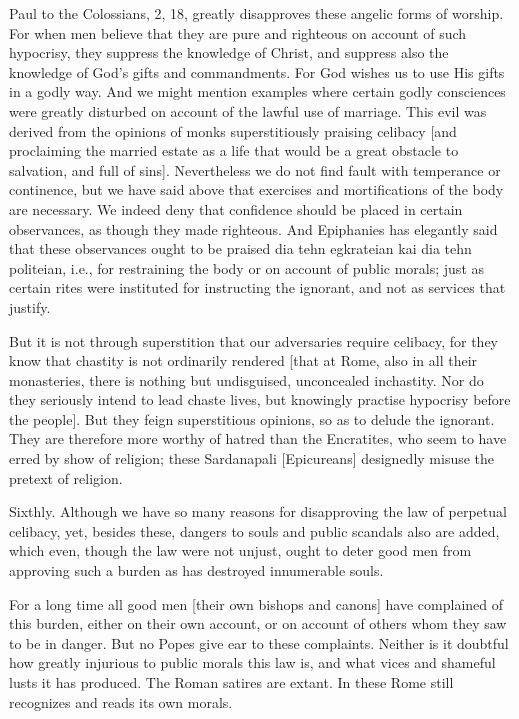 Paul to the Colossians, 2, 18, greatly disapproves these angelic
forms of worship.  For when men believe that they are pure and
righteous on account of such hypocrisy, they suppress the knowledge
of Christ, and suppress also the knowledge of God's gifts and
commandments.  For God wishes us to use His gifts in a godly way.
And we might mention examples where certain godly consciences were
greatly disturbed on account of the lawful use of marriage.  This
evil was derived from the opinions of monks superstitiously praising
celibacy [and proclaiming the married estate as a life that would be
a great obstacle to salvation, and full of sins].  Nevertheless we do
not find fault with temperance or continence, but we have said above
that exercises and mortifications of the body are necessary.  We
indeed deny that confidence should be placed in certain observances,
as though they made righteous.  And Epiphanies has elegantly said
that these observances ought to be praised dia tehn egkrateian kai
dia tehn politeian, i.e., for restraining the body or on account of
public morals; just as certain rites were instituted for instructing
the ignorant, and not as services that justify.

But it is not through superstition that our adversaries require
celibacy, for they know that chastity is not ordinarily rendered
[that at Rome, also in all their monasteries, there is nothing but
undisguised, unconcealed inchastity.  Nor do they seriously intend to
lead chaste lives, but knowingly practise hypocrisy before the
people].  But they feign superstitious opinions, so as to delude the
ignorant.  They are therefore more worthy of hatred than the
Encratites, who seem to have erred by show of religion; these
Sardanapali [Epicureans] designedly misuse the pretext of religion.

Sixthly.  Although we have so many reasons for disapproving the law
of perpetual celibacy, yet, besides these, dangers to souls and
public scandals also are added, which even, though the law were not
unjust, ought to deter good men from approving such a burden as has
destroyed innumerable souls.

For a long time all good men [their own bishops and canons] have
complained of this burden, either on their own account, or on account
of others whom they saw to be in danger.  But no Popes give ear to
these complaints.  Neither is it doubtful how greatly injurious to
public morals this law is, and what vices and shameful lusts it has
produced.  The Roman satires are extant.  In these Rome still
recognizes and reads its own morals.

